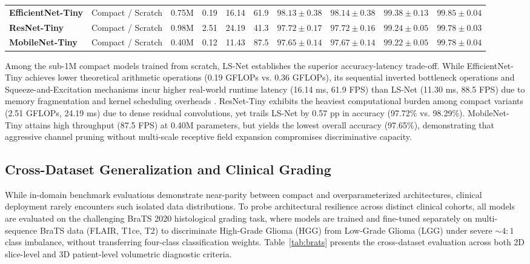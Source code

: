 \begin{table}[t]
{\begin{tabular}{llcccccccc}
\textbf{EfficientNet-Tiny} & Compact / Scratch & 0.75M & 0.19 & 16.14 & 61.9 & $98.13 \pm 0.38$ & $98.14 \pm 0.38$ & $99.38 \pm 0.13$ & $99.85 \pm 0.04$ \\
\textbf{ResNet-Tiny} & Compact / Scratch & 0.98M & 2.51 & 24.19 & 41.3 & $97.72 \pm 0.17$ & $97.72 \pm 0.16$ & $99.24 \pm 0.05$ & $99.78 \pm 0.03$ \\
\textbf{MobileNet-Tiny} & Compact / Scratch & 0.40M & 0.12 & 11.43 & 87.5 & $97.65 \pm 0.14$ & $97.67 \pm 0.14$ & $99.22 \pm 0.05$ & $99.78 \pm 0.04$ \\
\bottomrule
\end{tabular}}
\end{table}

Among the sub-1M compact models trained from scratch, LS-Net establishes the superior accuracy-latency trade-off. While EfficientNet-Tiny achieves lower theoretical arithmetic operations (0.19 GFLOPs vs. 0.36 GFLOPs), its sequential inverted bottleneck operations and Squeeze-and-Excitation mechanisms incur higher real-world runtime latency (16.14 ms, 61.9 FPS) than LS-Net (11.30 ms, 88.5 FPS) due to memory fragmentation and kernel scheduling overheads \cite{25}. ResNet-Tiny exhibits the heaviest computational burden among compact variants (2.51 GFLOPs, 24.19 ms) due to dense residual convolutions, yet trails LS-Net by 0.57 pp in accuracy (97.72\% vs. 98.29\%). MobileNet-Tiny attains high throughput (87.5 FPS) at 0.40M parameters, but yields the lowest overall accuracy (97.65\%), demonstrating that aggressive channel pruning without multi-scale receptive field expansion compromises discriminative capacity.

\subsection{Cross-Dataset Generalization and Clinical Grading}

While in-domain benchmark evaluations demonstrate near-parity between compact and overparameterized architectures, clinical deployment rarely encounters such isolated data distributions. To probe architectural resilience across distinct clinical cohorts, all models are evaluated on the challenging BraTS 2020 histological grading task, where models are trained and fine-tuned separately on multi-sequence BraTS data (FLAIR, T1ce, T2) to discriminate High-Grade Glioma (HGG) from Low-Grade Glioma (LGG) under severe $\sim 4:1$ class imbalance, without transferring four-class classification weights. Table~\ref{tab:brats} presents the cross-dataset evaluation across both 2D slice-level and 3D patient-level volumetric diagnostic criteria.

